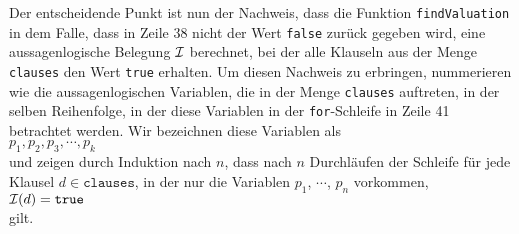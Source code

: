 Der entscheidende Punkt ist nun der Nachweis, dass die Funktion \texttt{findValuation} in dem Falle,
dass in Zeile 38 nicht der Wert \texttt{false} zur\"{u}ck gegeben wird, eine aussagenlogische Belegung $\mathcal{I}$ berechnet, bei der
alle Klauseln aus der Menge \texttt{clauses} den Wert \texttt{true} erhalten.  Um diesen Nachweis zu
erbringen, nummerieren wie die aussagenlogischen Variablen, die in der Menge \texttt{clauses}
auftreten, in der selben Reihenfolge, in der diese Variablen in der \texttt{for}-Schleife in Zeile
41 betrachtet werden.  Wir bezeichnen diese Variablen als
\\[0.2cm]
\hspace*{1.3cm}
 $p_1, p_2, p_3, \cdots, p_k$
\\[0.2cm]
und zeigen durch Induktion nach $n$, dass nach $n$ Durchl\"{a}ufen der Schleife f\"{u}r jede Klausel $d \in \mathtt{clauses}$, in der nur
die Variablen $p_1$, $\cdots$, $p_n$ vorkommen, 
\\[0.2cm]
\hspace*{1.3cm}
$\mathcal{I}(d) = \mathtt{true}$
\\[0.2cm]
gilt.
